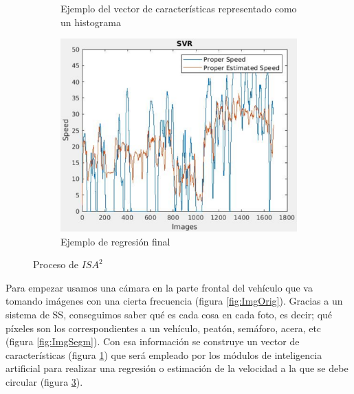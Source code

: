 \begin{figure}[H]
\begin{subfigure}[b]{0.4\linewidth}
    \caption{Ejemplo del vector de características representado como un histograma}
    \label{fig:Hist}
  \end{subfigure}
      \begin{subfigure}[b]{0.4\linewidth}
    \includegraphics[width=\linewidth]{Figuras/SVR_Urban(Nivel_1).eps}
    \caption{Ejemplo de regresión final}
    \label{fig:Regre}
  \end{subfigure}
  \caption{Proceso de $ISA^{2}$}
\end{figure}

Para empezar usamos una cámara en la parte frontal del vehículo que va tomando imágenes con una cierta frecuencia (figura \ref{fig:ImgOrig}). Gracias a un sistema de \ac{SS}, conseguimos saber qué es cada cosa en cada foto, es decir; qué píxeles son los correspondientes a un vehículo, peatón, semáforo, acera, etc (figura \ref{fig:ImgSegm}). Con esa información se construye un vector de características (figura \ref{fig:Hist}) que será empleado por los módulos de inteligencia artificial para realizar una regresión o estimación de la velocidad a la que se debe circular (figura \ref{fig:Regre}).


